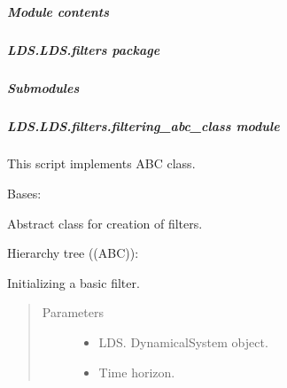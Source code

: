 \documentclass[letterpaper,10pt,english]{sphinxmanual}
\begin{document}
\subparagraph{Module contents}
\label{\detokenize{LDS.LDS.ds:module-LDS.LDS.ds}}\label{\detokenize{LDS.LDS.ds:module-contents}}

\subparagraph{LDS.LDS.filters package}
\label{\detokenize{LDS.LDS.filters:lds-lds-filters-package}}\label{\detokenize{LDS.LDS.filters::doc}}

\subparagraph{Submodules}
\label{\detokenize{LDS.LDS.filters:submodules}}

\subparagraph{LDS.LDS.filters.filtering\_abc\_class module}
\label{\detokenize{LDS.LDS.filters:module-LDS.LDS.filters.filtering_abc_class}}\label{\detokenize{LDS.LDS.filters:lds-lds-filters-filtering-abc-class-module}}
\sphinxAtStartPar
This script implements ABC class.

\begin{fulllineitems}
\label{\detokenize{LDS.LDS.filters:LDS.LDS.filters.filtering_abc_class.Filtering}}
\sphinxAtStartPar
Bases: 

\sphinxAtStartPar
Abstract class for creation of filters.

\sphinxAtStartPar
Hierarchy tree ((ABC)):

\noindent{}

\sphinxAtStartPar
Initializing a basic filter.
\begin{quote}\begin{description}
\item[{Parameters}] \leavevmode\begin{itemize}
\item {} 
\sphinxAtStartPar
{} \textendash{} LDS. DynamicalSystem object.

\item {} 
\sphinxAtStartPar
{} \textendash{} Time horizon.

\end{itemize}

\end{description}\end{quote}

\end{fulllineitems}
\end{document}
